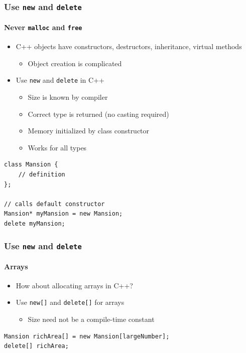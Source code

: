 \documentclass[table]{beamer}
\newcounter{rulecount}
\newcommand{\declarerule}{\textbf{\color{themeblue}{Rule \therulecount:}} }
\begin{document}
\begin{frame}[fragile]
    \frametitle{\declarerule Use \texttt{new} and \texttt{delete} }
    \framesubtitle{Never \texttt{malloc} and \texttt{free} }
    \begin{itemize}
        \item C++ objects have constructors, destructors, inheritance, virtual methods
            \begin{itemize}
                \item Object creation is complicated
            \end{itemize}
        \item Use \texttt{new} and \texttt{delete} in C++
            \begin{itemize}
                \item Size is known by compiler
                \item Correct type is returned (no casting required)
                \item Memory initialized by class constructor
                \item Works for all types
            \end{itemize}
    \end{itemize}
    \begin{lstlisting}[title=Dynamically allocating an object in C++]
class Mansion {
    // definition
};

// calls default constructor
Mansion* myMansion = new Mansion;
delete myMansion;
    \end{lstlisting}
\end{frame}

\begin{frame}[fragile]
    \frametitle{\declarerule Use \texttt{new} and \texttt{delete} }
    \framesubtitle{Arrays}
    \begin{itemize}
        \item How about allocating arrays in C++?
        \item Use \texttt{new[]} and \texttt{delete[]} for arrays 
            \begin{itemize}
                \item Size need not be a compile-time constant
            \end{itemize}
    \end{itemize}
    \begin{lstlisting}[title=Dynamically allocating an array of objects in C++]
Mansion richArea[] = new Mansion[largeNumber];
delete[] richArea;
    \end{lstlisting}
\end{frame}



\end{document}
